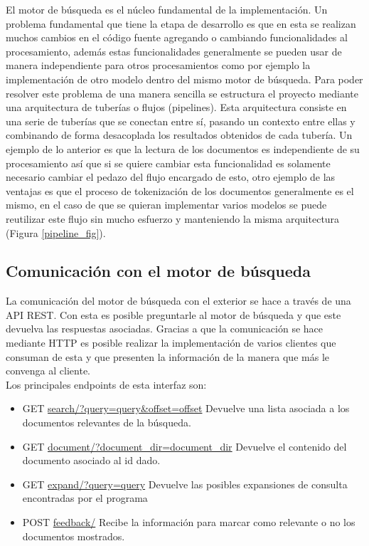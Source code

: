 \documentclass[runningheads]{llncs}
\begin{document}
El motor de búsqueda es el núcleo fundamental de la implementación. Un problema fundamental que
tiene la etapa de desarrollo es que en esta se realizan muchos cambios en el código fuente agregando
o cambiando funcionalidades al procesamiento, además estas funcionalidades generalmente se pueden usar
de manera independiente para otros procesamientos como por ejemplo la implementación de otro modelo
dentro del mismo motor de búsqueda. Para poder resolver este problema de una manera sencilla se estructura
el proyecto mediante una arquitectura de tuberías o flujos (pipelines). Esta arquitectura consiste en una serie
de tuberías que se conectan entre sí, pasando un contexto entre ellas y combinando de forma desacoplada
los resultados obtenidos de cada tubería. Un ejemplo de lo anterior es que la lectura de los documentos
es independiente de su procesamiento así que si se quiere cambiar esta funcionalidad es solamente necesario
cambiar el pedazo del flujo encargado de esto, otro ejemplo de las ventajas es que el proceso de
tokenización de los documentos generalmente es el mismo, en el caso de que se quieran implementar varios
modelos se puede reutilizar este flujo sin mucho esfuerzo y manteniendo la misma arquitectura (Figura \ref{pipeline_fig}).


\subsection{Comunicación con el motor de búsqueda}

La comunicación del motor de búsqueda con el exterior se hace a través de una API REST. Con esta
es posible preguntarle al motor de búsqueda y que este devuelva las respuestas asociadas. Gracias
a que la comunicación se hace mediante HTTP es posible realizar la implementación de varios clientes
que consuman de esta y que presenten la información de la manera que más le convenga al cliente.\\

Los principales endpoints de esta interfaz son:

\begin{itemize}
    \item GET \url{search/?query=query\&offset=offset} Devuelve una lista asociada a los
documentos relevantes de la búsqueda.
    \item GET \url{document/?document\_dir=document\_dir} Devuelve el contenido del documento asociado
al id dado.
	\item GET \url{expand/?query=query} Devuelve las posibles expansiones de consulta encontradas por el programa
	\item POST \url{feedback/} Recibe la información para marcar como relevante o no los documentos mostrados.
\end{itemize}
\end{document}
